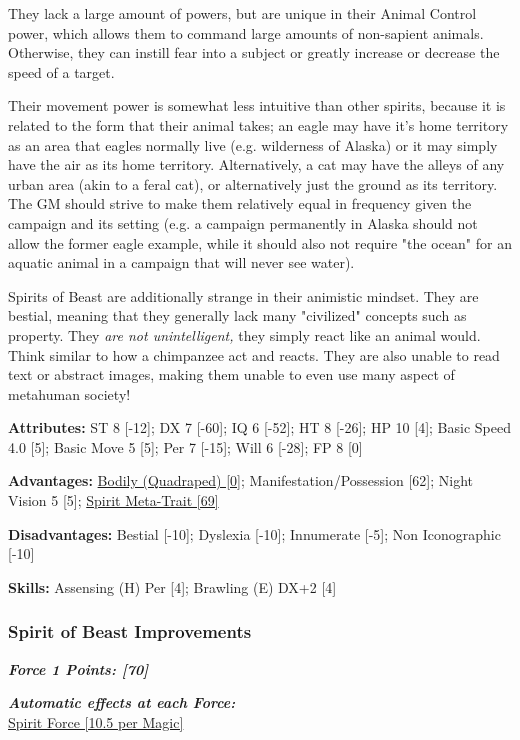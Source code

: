 \begin{multicols}{3}
	They lack a large amount of powers, but are unique in their Animal Control power, which allows them to command large amounts of non-sapient animals. Otherwise, they can instill fear into a subject or greatly increase or decrease the speed of a target. 
	
	Their movement power is somewhat less intuitive than other spirits, because it is related to the form that their animal takes; an eagle may have it's home territory as an area that eagles normally live (e.g. wilderness of Alaska) or it may simply have the air as its home territory. Alternatively, a cat may have the alleys of any urban area (akin to a feral cat), or alternatively just the ground as its territory. The GM should strive to make them relatively equal in frequency given the campaign and its setting (e.g. a campaign permanently in Alaska should not allow the former eagle example, while it should also not require "the ocean" for an aquatic animal in a campaign that will never see water).
	
	Spirits of Beast are additionally strange in their animistic mindset. They are bestial, meaning that they generally lack many "civilized" concepts such as property. They \textit{are not unintelligent,} they simply react like an animal would. Think similar to how a chimpanzee act and reacts. They are also unable to read text or abstract images, making them unable to even use many aspect of metahuman society!
	
	\textbf{Attributes:}
	ST 8 [-12]; DX 7 [-60]; IQ 6 [-52]; HT 8 [-26]; HP 10 [4]; Basic Speed 4.0 [5]; Basic Move 5 [5]; Per 7 [-15]; Will 6 [-28]; FP 8 [0]
	
	\textbf{Advantages:}
	\hyperref[elemental]{Bodily (Quadraped) [0]}; Manifestation/Possession [62]; Night Vision 5 [5]; \hyperref[spirit_meta_trait]{Spirit Meta-Trait [69]}
	
	\textbf{Disadvantages:} 
	Bestial [-10]; Dyslexia [-10]; Innumerate [-5]; Non Iconographic [-10]
	
	\textbf{Skills:} 
	Assensing (H) Per [4]; Brawling (E) DX+2 [4]
	
	\subsubsection*{Spirit of Beast Improvements}
	
	\textbf{\textit{Force 1 Points: [70]}}
	
	\textbf{\textit{Automatic effects at each Force:\\}}
	\hyperref[spirit_force]{Spirit Force [10.5 per Magic]}\\\\
	

\end{multicols}
